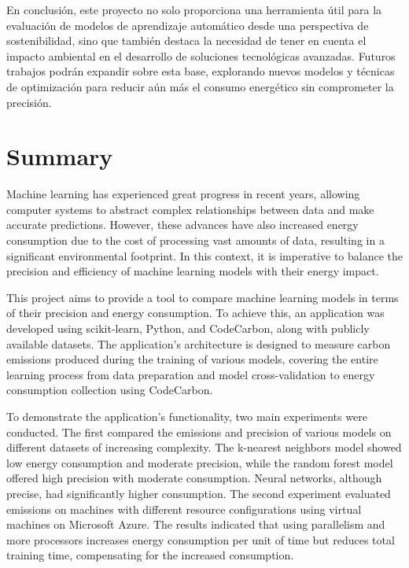 \documentclass[a4paper, 12pt, oneside]{book}
\begin{document}
En conclusión, este proyecto no solo proporciona una herramienta útil para la evaluación de modelos de aprendizaje automático desde una perspectiva de sostenibilidad, sino que también destaca la necesidad de tener en cuenta el impacto ambiental en el desarrollo de soluciones tecnológicas avanzadas. Futuros trabajos podrán expandir sobre esta base, explorando nuevos modelos y técnicas de optimización para reducir aún más el consumo energético sin comprometer la precisión.


\chapter*{Summary}

Machine learning has experienced great progress in recent years, allowing computer systems to abstract complex relationships between data and make accurate predictions. However, these advances have also increased energy consumption due to the cost of processing vast amounts of data, resulting in a significant environmental footprint. In this context, it is imperative to balance the precision and efficiency of machine learning models with their energy impact.

This project aims to provide a tool to compare machine learning models in terms of their precision and energy consumption. To achieve this, an application was developed using scikit-learn, Python, and CodeCarbon, along with publicly available datasets. The application's architecture is designed to measure carbon emissions produced during the training of various models, covering the entire learning process from data preparation and model cross-validation to energy consumption collection using CodeCarbon.

To demonstrate the application’s functionality, two main experiments were conducted. The first compared the emissions and precision of various models on different datasets of increasing complexity. The k-nearest neighbors model showed low energy consumption and moderate precision, while the random forest model offered high precision with moderate consumption. Neural networks, although precise, had significantly higher consumption. The second experiment evaluated emissions on machines with different resource configurations using virtual machines on Microsoft Azure. The results indicated that using parallelism and more processors increases energy consumption per unit of time but reduces total training time, compensating for the increased consumption.
\end{document}

